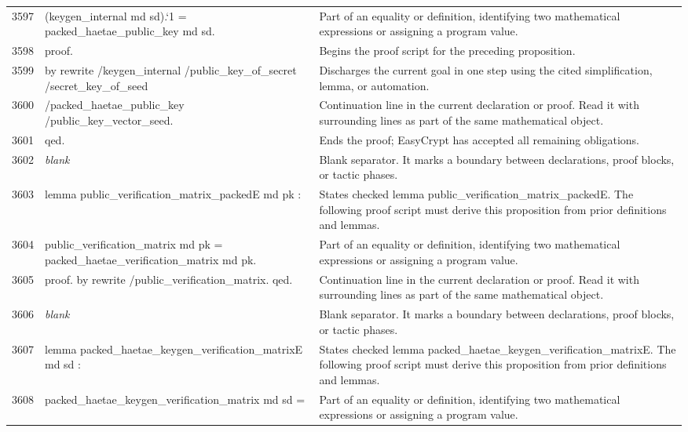 \documentclass[10pt]{article}
\begin{document}
\begin{longtable}{r L{0.53\textwidth} L{0.37\textwidth}}
3597 & {\ttfamily\scriptsize   (keygen\_internal md sd).`1 = packed\_haetae\_public\_key md sd.} & Part of an equality or definition, identifying two mathematical expressions or assigning a program value. \\
3598 & {\ttfamily\scriptsize proof.} & Begins the proof script for the preceding proposition. \\
3599 & {\ttfamily\scriptsize by rewrite /keygen\_internal /public\_key\_of\_secret /secret\_key\_of\_seed} & Discharges the current goal in one step using the cited simplification, lemma, or automation. \\
3600 & {\ttfamily\scriptsize            /packed\_haetae\_public\_key /public\_key\_vector\_seed.} & Continuation line in the current declaration or proof.  Read it with surrounding lines as part of the same mathematical object. \\
3601 & {\ttfamily\scriptsize qed.} & Ends the proof; EasyCrypt has accepted all remaining obligations. \\
3602 & {\ttfamily\scriptsize \emph{blank}} & Blank separator.  It marks a boundary between declarations, proof blocks, or tactic phases. \\
3603 & {\ttfamily\scriptsize lemma public\_verification\_matrix\_packedE md pk :} & States checked lemma public\_verification\_matrix\_packedE.  The following proof script must derive this proposition from prior definitions and lemmas. \\
3604 & {\ttfamily\scriptsize   public\_verification\_matrix md pk = packed\_haetae\_verification\_matrix md pk.} & Part of an equality or definition, identifying two mathematical expressions or assigning a program value. \\
3605 & {\ttfamily\scriptsize proof. by rewrite /public\_verification\_matrix. qed.} & Continuation line in the current declaration or proof.  Read it with surrounding lines as part of the same mathematical object. \\
3606 & {\ttfamily\scriptsize \emph{blank}} & Blank separator.  It marks a boundary between declarations, proof blocks, or tactic phases. \\
3607 & {\ttfamily\scriptsize lemma packed\_haetae\_keygen\_verification\_matrixE md sd :} & States checked lemma packed\_haetae\_keygen\_verification\_matrixE.  The following proof script must derive this proposition from prior definitions and lemmas. \\
3608 & {\ttfamily\scriptsize   packed\_haetae\_keygen\_verification\_matrix md sd =} & Part of an equality or definition, identifying two mathematical expressions or assigning a program value. \\

\end{longtable}
\end{document}
